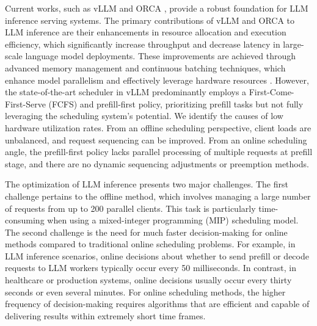 Current works, such as vLLM \cite{kwon2023efficient} and ORCA \cite{yu2022orca}, provide a robust foundation for LLM inference serving systems. The primary contributions of vLLM and ORCA to LLM inference are their enhancements in resource allocation and execution efficiency, which significantly increase throughput and decrease latency in large-scale language model deployments. These improvements are achieved through advanced memory management and continuous batching techniques, which enhance model parallelism and effectively leverage hardware resources \cite{kwon2023efficient, yu2022orca}.
However, the state-of-the-art scheduler in vLLM predominantly employs a First-Come-First-Serve (FCFS) and prefill-first policy, prioritizing prefill tasks but not fully leveraging the scheduling system's potential. We identify the causes of low hardware utilization rates. From an offline scheduling perspective, client loads are unbalanced, and request sequencing can be improved. From an online scheduling angle, the prefill-first policy lacks parallel processing of multiple requests at prefill stage, and there are no dynamic sequencing adjustments or preemption methods.

The optimization of LLM inference presents two major challenges. The first challenge pertains to the offline method, which involves managing a large number of requests from up to 200 parallel clients. This task is particularly time-consuming when using a mixed-integer programming (MIP) scheduling model. The second challenge is the need for much faster decision-making for online methods compared to traditional online scheduling problems. For example, in LLM inference scenarios, online decisions about whether to send prefill or decode requests to LLM workers typically occur every 50 milliseconds. In contrast, in healthcare or production systems, online decisions usually occur every thirty seconds or even several minutes. For online scheduling methods, the higher frequency of decision-making requires algorithms that are efficient and capable of delivering results within extremely short time frames.


